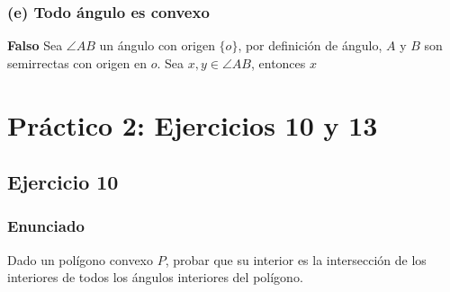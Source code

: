 \documentclass[a4paper]{article}
\begin{document}
\subsubsection{(e) Todo ángulo es convexo}
\textbf{Falso} Sea $\angle AB$ un ángulo con origen $\{o\}$, por definición de ángulo, $A$ y $B$ son semirrectas con origen en $o$. Sea $x,y \in \angle AB$, entonces $x$

\section{Práctico 2: Ejercicios 10 y 13}
\subsection{Ejercicio 10}
\subsubsection{Enunciado}
Dado un polígono convexo $P$, probar que su interior es la intersección de los interiores de todos los ángulos interiores del polígono.
\end{document}
